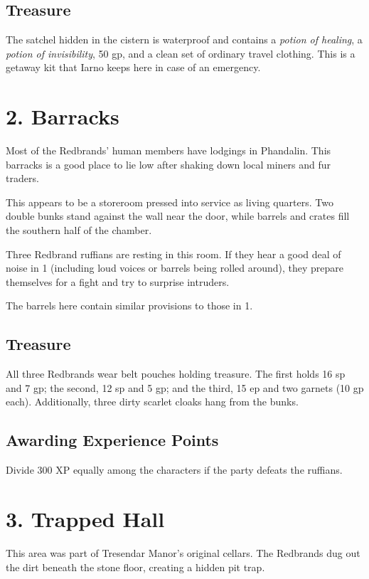 \documentclass[10pt,a4paper,twoside,bg=print,twocolumn,openany,nodeprecatedcode]{dndbook}
\begin{document}
\subsection{Treasure}
The satchel hidden in the cistern is waterproof and contains a \textit{potion of healing}, a \textit{potion of invisibility}, 50 gp, and a clean set of ordinary travel clothing. This is a getaway kit that Iarno keeps here in case of an emergency.

\section{2. Barracks}
Most of the Redbrands' human members have lodgings in Phandalin. This barracks is a good place to lie low after shaking down local miners and fur traders.

\begin{DndReadAloud}{}
This appears to be a storeroom pressed into service as living quarters. Two double bunks stand against the wall near the door, while barrels and crates fill the southern half of the chamber.

\end{DndReadAloud}

Three Redbrand ruffians are resting in this room. If they hear a good deal of noise in 1 (including loud voices or barrels being rolled around), they prepare themselves for a fight and try to surprise intruders.

The barrels here contain similar provisions to those in 1.

\subsection{Treasure}
All three Redbrands wear belt pouches holding treasure. The first holds 16 sp and 7 gp; the second, 12 sp and 5 gp; and the third, 15 ep and two garnets (10 gp each). Additionally, three dirty scarlet cloaks hang from the bunks.

\subsection{Awarding Experience Points}
Divide 300 XP equally among the characters if the party defeats the ruffians.

\section{3. Trapped Hall}
This area was part of Tresendar Manor's original cellars. The Redbrands dug out the dirt beneath the stone floor, creating a hidden pit trap.
\end{document}
